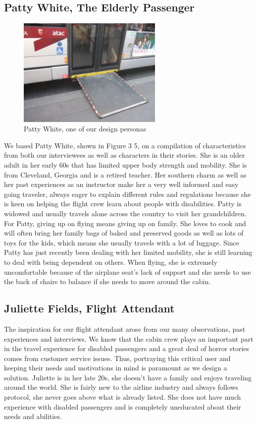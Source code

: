 \subsection{Patty White, The Elderly Passenger}

\begin{figure}[h]
  \centering
     \includegraphics[width=7cm]{images/image041}
   \caption{Patty White, one of our design personas}
  \label{fig:41}
\end{figure}

We based Patty White, shown in Figure 3 5, on a compilation of characteristics from both our interviewees as well as characters in their stories. She is an older adult in her early 60s that has limited upper body strength and mobility. She is from Cleveland, Georgia and is a retired teacher. Her southern charm as well as her past experiences as an instructor make her a very well informed and easy going traveler, always eager to explain different rules and regulations because she is keen on helping the flight crew learn about people with disabilities. Patty is widowed and usually travels alone across the country to visit her grandchildren. For Patty, giving up on flying means giving up on family. She loves to cook and will often bring her family bags of baked and preserved goods as well as lots of toys for the kids, which means she usually travels with a lot of luggage.  Since Patty has just recently been dealing with her limited mobility, she is still learning to deal with being dependent on others. When flying, she is extremely uncomfortable because of the airplane seat’s lack of support and she needs to use the back of chairs to balance if she needs to move around the cabin.

\subsection{Juliette Fields, Flight Attendant}

The inspiration for our flight attendant arose from our many observations, past experiences and interviews. We know that the cabin crew plays an important part in the travel experience for disabled passengers and a great deal of horror stories comes from customer service issues. Thus, portraying this critical user and keeping their needs and motivations in mind is paramount as we design a solution. Juliette is in her late 20s, she doesn’t have a family and enjoys traveling around the world. She is fairly new to the airline industry and always follows protocol, she never goes above what is already listed. She does not have much experience with disabled passengers and is completely uneducated about their needs and abilities. 

